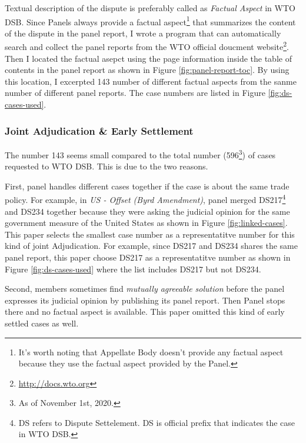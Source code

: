Textual description of the dispute is preferably called as
\textit{Factual Aspect} in WTO DSB. 
Since Panels
always provide a factual aspect\footnote{
    It's worth noting that Appellate Body doesn't provide any factual aspect because they use the factual aspect provided by the Panel.
}
that summarizes the content of the dispute
in the panel report, %
I wrote a program that can 
automatically search and collect 
the panel reports from the WTO official doucment website\footnote{
    \url{http://docs.wto.org}
}.
Then I located the factual asepct using the page information inside the 
table of contents in the panel report as shown in Figure \ref{fig:panel-report-toc}.
By using this location, I excerpted 143 number of different factual aspects from the sanme number of different panel reports. The case numbers are listed in Figure \ref{fig:ds-cases-used}.

\subsubsection{Joint Adjudication \& Early Settlement}

The number 143 seems small compared to the total number (596\footnote
{As of November 1st, 2020.}) of cases requested to WTO DSB. This is due to the two reasons. 

First, panel handles different cases together if the case is about the
same trade policy. For example, in \textit{US - Offset (Byrd Amendment)}, panel merged DS217\footnote{
    DS refers to Dispute Settelement. DS is official prefix that indicates the case in WTO DSB.
} and DS234 together because they were asking the judicial opinion for the same government measure of the United States as shown in Figure \ref{fig:linked-cases}. 
This paper selects the smallest case number as a representatitve number for this kind of joint Adjudication. 
For example, since DS217 and DS234 shares the same panel report, this paper choose DS217 as a representatitve number as shown in Figure \ref{fig:ds-cases-used} where the list includes DS217 but not DS234.

Second, members sometimes find \textit{mutually agreeable solution} before the panel expresses its judicial opinion by publishing its panel report. Then Panel stops there and no factual aspect is available. This paper omitted this kind of early settled cases as well.

 

